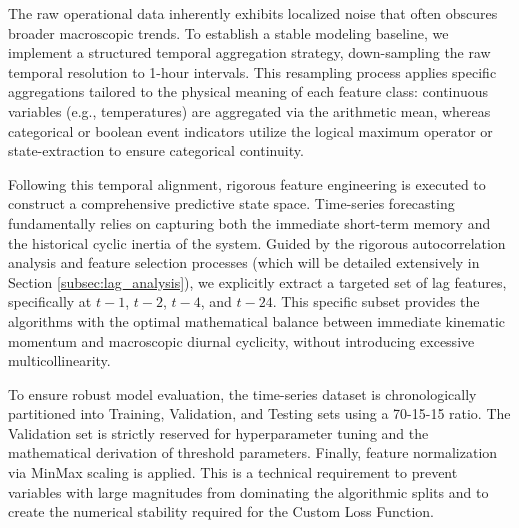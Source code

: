 \documentclass[pdflatex,sn-mathphys-num]{sn-jnl}%
\theoremstyle{thmstyleone}%
\theoremstyle{thmstyletwo}%
\theoremstyle{thmstylethree}%
\begin{document}
The raw operational data inherently exhibits localized noise that often obscures broader macroscopic trends. To establish a stable modeling baseline, we implement a structured temporal aggregation strategy, down-sampling the raw temporal resolution to 1-hour intervals. This resampling process applies specific aggregations tailored to the physical meaning of each feature class: continuous variables (e.g., temperatures) are aggregated via the arithmetic mean, whereas categorical or boolean event indicators utilize the logical maximum operator or state-extraction to ensure categorical continuity.

Following this temporal alignment, rigorous feature engineering is executed to construct a comprehensive predictive state space. Time-series forecasting fundamentally relies on capturing both the immediate short-term memory and the historical cyclic inertia of the system. Guided by the rigorous autocorrelation analysis and feature selection processes (which will be detailed extensively in Section \ref{subsec:lag_analysis}), we explicitly extract a targeted set of lag features, specifically at $t-1$, $t-2$, $t-4$, and $t-24$. This specific subset provides the algorithms with the optimal mathematical balance between immediate kinematic momentum and macroscopic diurnal cyclicity, without introducing excessive multicollinearity.

To ensure robust model evaluation, the time-series dataset is chronologically partitioned into Training, Validation, and Testing sets using a 70-15-15 ratio. The Validation set is strictly reserved for hyperparameter tuning and the mathematical derivation of threshold parameters. Finally, feature normalization via MinMax scaling is applied. This is a technical requirement to prevent variables with large magnitudes from dominating the algorithmic splits and to create the numerical stability required for the Custom Loss Function.
\end{document}
